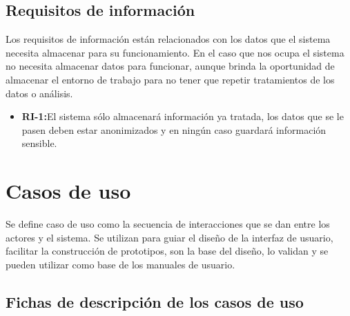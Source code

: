 \bigskip

\subsection{Requisitos de información}

Los requisitos de información están relacionados con los datos que el sistema necesita almacenar para su funcionamiento. En el caso que nos ocupa el sistema no necesita almacenar datos para funcionar, aunque brinda la oportunidad de almacenar el entorno de trabajo para no tener que repetir tratamientos de los datos o análisis. 

\begin{itemize}
\item \textbf{RI-1:}El sistema sólo almacenará información ya tratada, los datos que se le pasen deben estar anonimizados y en ningún caso guardará información sensible.
\end{itemize}

\bigskip

\section{Casos de uso}

Se define caso de uso como la secuencia de interacciones que se dan entre los actores y el sistema. Se utilizan para guiar el diseño de la interfaz de usuario, facilitar la construcción de prototipos, son la base del diseño, lo validan y se pueden utilizar como base de los manuales de usuario.

\bigskip

\subsection{Fichas de descripción de los casos de uso}

